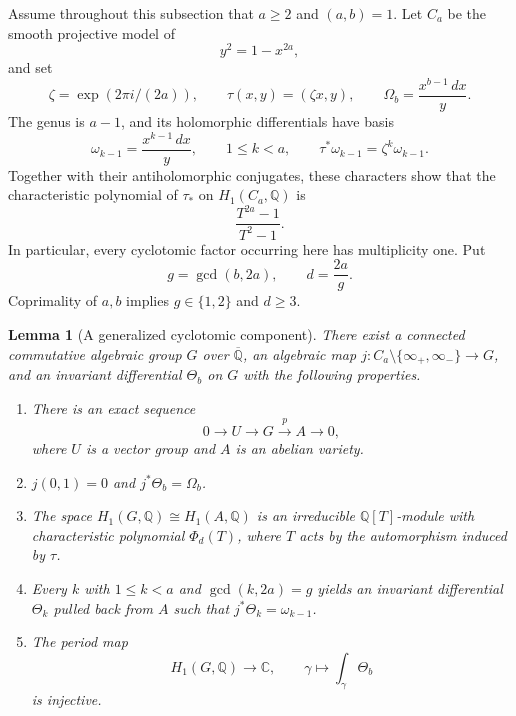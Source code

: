 \documentclass[11pt,a4paper]{article}
\newtheorem{lemma}[theorem]{Lemma}
\theoremstyle{definition}
\theoremstyle{remark}
\numberwithin{equation}{section}
\newcommand{\Qbar}{\overline{\mathbb Q}}
\begin{document}
Assume throughout this subsection that $a\ge2$ and $(a,b)=1$.  Let
$C_a$ be the smooth projective model of
\[
 y^2=1-x^{2a},
\]
and set
\[
 \zeta=\exp(2\pi i/(2a)),\qquad
 \tau(x,y)=(\zeta x,y),\qquad
 \Omega_b=\frac{x^{b-1}\,dx}{y}.
\]
The genus is $a-1$, and its holomorphic differentials have basis
\begin{equation}
 \omega_{k-1}=\frac{x^{k-1}\,dx}{y},
 \qquad 1\le k<a,
 \qquad \tau^*\omega_{k-1}=\zeta^k\omega_{k-1}.
 \label{bs-holomorphic-basis}
\end{equation}
Together with their antiholomorphic conjugates, these characters show
that the characteristic polynomial of $\tau_*$ on
$H_1(C_a,\mathbb Q)$ is
\begin{equation}
 \frac{T^{2a}-1}{T^2-1}.
 \label{bs-homology-characteristic}
\end{equation}
In particular, every cyclotomic factor occurring here has multiplicity
one.  Put
\[
 g=\gcd(b,2a),\qquad d=\frac{2a}{g}.
\]
Coprimality of $a,b$ implies $g\in\{1,2\}$ and $d\ge3$.

\begin{lemma}[A generalized cyclotomic component]
\label{bs-generalized-component}
There exist a connected commutative algebraic group $G$ over $\Qbar$,
an algebraic map $j:C_a\setminus\{\infty_+,\infty_-\}\to G$,
and an invariant differential $\Theta_b$ on $G$ with the following
properties.
\begin{enumerate}
\item There is an exact sequence
\[
 0\longrightarrow U\longrightarrow G
   \overset{p}{\longrightarrow}A\longrightarrow0,
\]
where $U$ is a vector group and $A$ is an abelian variety.
\item $j(0,1)=0$ and $j^*\Theta_b=\Omega_b$.
\item The space $H_1(G,\mathbb Q)\cong H_1(A,\mathbb Q)$ is an
irreducible $\mathbb Q[T]$-module with characteristic polynomial
$\Phi_d(T)$, where $T$ acts by the automorphism induced by $\tau$.
\item Every $k$ with $1\le k<a$ and $\gcd(k,2a)=g$ yields an
invariant differential $\Theta_k$ pulled back from $A$ such that
$j^*\Theta_k=\omega_{k-1}$.
\item The period map
\[
 H_1(G,\mathbb Q)\longrightarrow\mathbb C,
 \qquad \gamma\longmapsto\int_\gamma\Theta_b
\]
is injective.
\end{enumerate}
\end{lemma}
\end{document}

